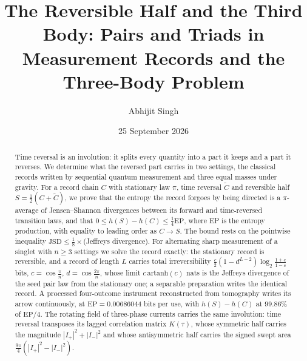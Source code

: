 \documentclass[11pt]{article}
\title{\textbf{The Reversible Half and the Third Body: Pairs and Triads in Measurement Records and the Three-Body Problem}}
\author{Abhijit Singh}
\date{25 September 2026}
\theoremstyle{definition}\newtheorem{definition}[theorem]{Definition}
\theoremstyle{remark}\newtheorem{remark}[theorem]{Remark}
\begin{document}
\maketitle
\begin{abstract}
Time reversal is an involution: it splits every quantity into a part it keeps and a part it reverses. We determine what the reversed part carries in two settings, the classical records written by sequential quantum measurement and three equal masses under gravity. For a record chain $C$ with stationary law $\pi$, time reversal $\tilde C$ and reversible half $S=\frac12(C+\tilde C)$, we prove that the entropy the record forgoes by being directed is a $\pi$-average of Jensen--Shannon divergences between its forward and time-reversed transition laws, and that $0\le h(S)-h(C)\le\frac14\mathrm{EP}$, where EP is the entropy production, with equality to leading order as $C\to S$. The bound rests on the pointwise inequality $\mathrm{JSD}\le\frac18\times$(Jeffreys divergence). For alternating sharp measurement of a singlet with $n\ge3$ settings we solve the record exactly: the stationary record is reversible, and a record of length $L$ carries total irreversibility $\frac c2(1-d^{L-2})\log_2\frac{1+c}{1-c}$ bits, $c=\cos\frac\pi n$, $d=\cos\frac{2\pi}n$, whose limit $c\,\mathrm{artanh}(c)$ nats is the Jeffreys divergence of the seed pair law from the stationary one; a separable preparation writes the identical record. A processed four-outcome instrument reconstructed from tomography writes its arrow continuously, at $\mathrm{EP}=0.00686044$ bits per use, with $h(S)-h(C)$ at $99.86\%$ of $\mathrm{EP}/4$. The rotating field of three-phase currents carries the same involution: time reversal transposes its lagged correlation matrix $K(\tau)$, whose symmetric half carries the magnitude $|I_+|^2+|I_-|^2$ and whose antisymmetric half carries the signed swept area $\frac{9\pi}4(|I_+|^2-|I_-|^2)$.


\end{abstract}
\end{document}
